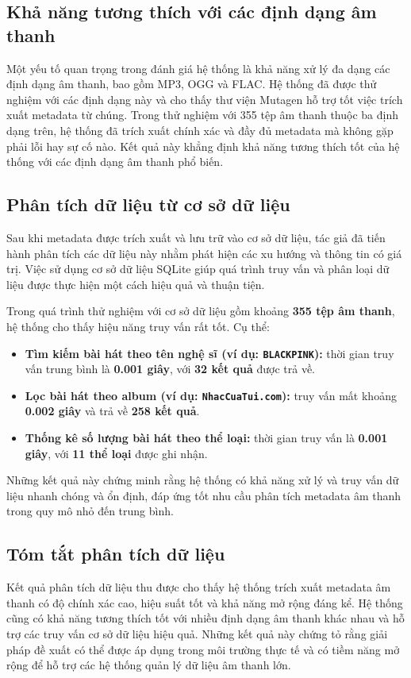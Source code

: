 \documentclass[conference]{IEEEtran}
\begin{document}
\subsection{Khả năng tương thích với các định dạng âm thanh}

Một yếu tố quan trọng trong đánh giá hệ thống là khả năng xử lý đa dạng các định dạng âm thanh, bao gồm MP3, OGG và FLAC. Hệ thống đã được thử nghiệm với các định dạng này và cho thấy thư viện Mutagen hỗ trợ tốt việc trích xuất metadata từ chúng.
Trong thử nghiệm với 355 tệp âm thanh thuộc ba định dạng trên, hệ thống đã trích xuất chính xác và đầy đủ metadata mà không gặp phải lỗi hay sự cố nào. Kết quả này khẳng định khả năng tương thích tốt của hệ thống với các định dạng âm thanh phổ biến.

\subsection{Phân tích dữ liệu từ cơ sở dữ liệu}

Sau khi metadata được trích xuất và lưu trữ vào cơ sở dữ liệu, tác giả đã tiến hành phân tích các dữ liệu này nhằm phát hiện các xu hướng và thông tin có giá trị. Việc sử dụng cơ sở dữ liệu SQLite giúp quá trình truy vấn và phân loại dữ liệu được thực hiện một cách hiệu quả và thuận tiện. 

Trong quá trình thử nghiệm với cơ sở dữ liệu gồm khoảng \textbf{355 tệp âm thanh}, hệ thống cho thấy hiệu năng truy vấn rất tốt. Cụ thể:

\begin{itemize}
    \item \textbf{Tìm kiếm bài hát theo tên nghệ sĩ (ví dụ: \texttt{BLACKPINK}):} thời gian truy vấn trung bình là \textbf{0.001 giây}, với \textbf{32 kết quả} được trả về.
    \item \textbf{Lọc bài hát theo album (ví dụ: \texttt{NhacCuaTui.com}):} truy vấn mất khoảng \textbf{0.002 giây} và trả về \textbf{258 kết quả}.
    \item \textbf{Thống kê số lượng bài hát theo thể loại:} thời gian truy vấn là \textbf{0.001 giây}, với \textbf{11 thể loại} được ghi nhận.
\end{itemize}

Những kết quả này chứng minh rằng hệ thống có khả năng xử lý và truy vấn dữ liệu nhanh chóng và ổn định, đáp ứng tốt nhu cầu phân tích metadata âm thanh trong quy mô nhỏ đến trung bình.

\subsection{Tóm tắt phân tích dữ liệu}
Kết quả phân tích dữ liệu thu được cho thấy hệ thống trích xuất metadata âm thanh có độ chính xác cao, hiệu suất tốt và khả năng mở rộng đáng kể. Hệ thống cũng có khả năng tương thích tốt với nhiều định dạng âm thanh khác nhau và hỗ trợ các truy vấn cơ sở dữ liệu hiệu quả. Những kết quả này chứng tỏ rằng giải pháp đề xuất có thể được áp dụng trong môi trường thực tế và có tiềm năng mở rộng để hỗ trợ các hệ thống quản lý dữ liệu âm thanh lớn.
\end{document}
